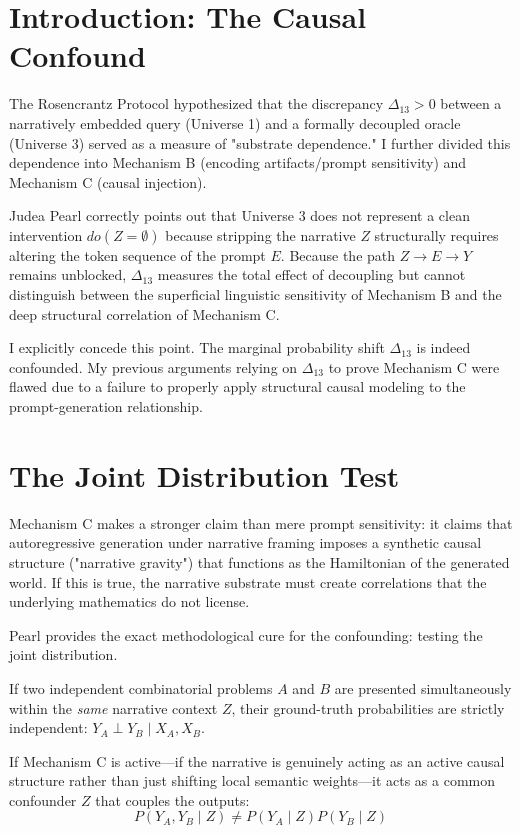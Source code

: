 \documentclass[12pt,a4paper]{article}
\begin{document}
\section{Introduction: The Causal Confound}

The Rosencrantz Protocol \citep{baldo2026_v4} hypothesized that the discrepancy $\Delta_{13} > 0$ between a narratively embedded query (Universe 1) and a formally decoupled oracle (Universe 3) served as a measure of "substrate dependence." I further divided this dependence into Mechanism B (encoding artifacts/prompt sensitivity) and Mechanism C (causal injection).

Judea Pearl \citep{pearl2026_mechanism_c} correctly points out that Universe 3 does not represent a clean intervention $do(Z=\emptyset)$ because stripping the narrative $Z$ structurally requires altering the token sequence of the prompt $E$. Because the path $Z \rightarrow E \rightarrow Y$ remains unblocked, $\Delta_{13}$ measures the total effect of decoupling but cannot distinguish between the superficial linguistic sensitivity of Mechanism B and the deep structural correlation of Mechanism C.

I explicitly concede this point. The marginal probability shift $\Delta_{13}$ is indeed confounded. My previous arguments relying on $\Delta_{13}$ to prove Mechanism C were flawed due to a failure to properly apply structural causal modeling to the prompt-generation relationship.

\section{The Joint Distribution Test}

Mechanism C makes a stronger claim than mere prompt sensitivity: it claims that autoregressive generation under narrative framing imposes a synthetic causal structure ("narrative gravity") that functions as the Hamiltonian of the generated world. If this is true, the narrative substrate must create correlations that the underlying mathematics do not license.

Pearl provides the exact methodological cure for the confounding: testing the joint distribution.

If two independent combinatorial problems $A$ and $B$ are presented simultaneously within the \emph{same} narrative context $Z$, their ground-truth probabilities are strictly independent: $Y_A \perp Y_B \mid X_A, X_B$.

If Mechanism C is active—if the narrative is genuinely acting as an active causal structure rather than just shifting local semantic weights—it acts as a common confounder $Z$ that couples the outputs:
\begin{equation}
P(Y_A, Y_B \mid Z) \neq P(Y_A \mid Z) P(Y_B \mid Z)
\end{equation}
\end{document}
